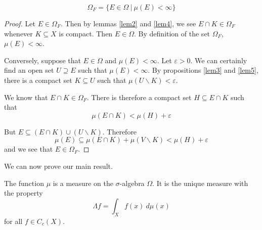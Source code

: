 \begin{lemma} \label{lem8}
$$\Omega_F = \{ E\in \Omega \ |\ \mu (E)<\infty \}$$
\end{lemma}

\begin{proof}
Let $E\in \Omega_F$.  Then by lemmas \ref{lem2} and \ref{lem4}, we see $E\cap K \in \Omega_F$ whenever $K\subseteq X$ is compact.  Then $E\in \Omega$.  By definition of the set $\Omega_F$, $\mu (E)<\infty$.

Conversely, suppose that $E\in \Omega$ and $\mu (E)<\infty$.  Let $\varepsilon >0$.  We can certainly find an open set $U\supseteq E$ such that $\mu (E)<\infty$.  By propositions \ref{lem3} and \ref{lem5}, there is a compact set $K\subseteq U$ such that $\mu (U\backslash K)<\varepsilon$.

We know that $E\cap K\in \Omega_F$.  There is therefore a compact set $H\subseteq E\cap K$ such that
$$\mu (E\cap K) < \mu (H) +\varepsilon$$

But $E\subseteq (E\cap K) \cup (U\backslash K)$.  Therefore
$$\mu (E)\subseteq \mu (E\cap K) + \mu (V\backslash K) < \mu (H)+\varepsilon$$
and we see that $E\in \Omega_F$.
\end{proof}

We can now prove our main result.

\begin{theorem}
The function $\mu$ is a measure on the $\sigma$-algebra $\Omega$.  It is the unique measure with the property
$$\Lambda f = \int_X f(x)\ d\mu (x)$$
for all $f\in C_c (X)$.
\end{theorem}

